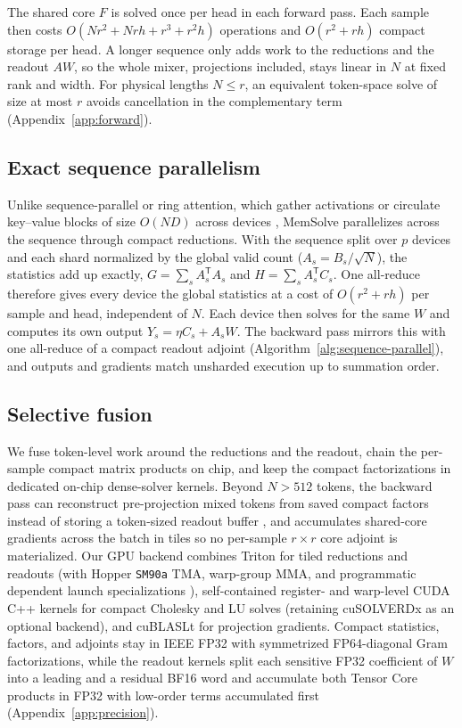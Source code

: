 \documentclass[10pt,twocolumn]{article}
\newcommand{\T}{\mathsf{T}}
\begin{document}
The shared core $F$ is solved once per head in each forward pass.
Each sample then costs $O(Nr^2+Nrh+r^3+r^2h)$ operations and $O(r^2+rh)$
compact storage per head.
A longer sequence only adds work to the reductions and the readout $AW$, so
the whole mixer, projections included, stays linear in $N$ at fixed rank and
width.
For physical lengths $N\le r$, an equivalent token-space solve of size at most
$r$ avoids cancellation in the complementary term (Appendix~\ref{app:forward}).

\subsection{Exact sequence parallelism}

Unlike sequence-parallel or ring attention, which gather activations or
circulate key--value blocks of size $O(ND)$ across devices
\cite{korthikanti2023reducing,liu2024ring}, MemSolve parallelizes across the
sequence through compact reductions.
With the sequence split over $p$ devices and each shard normalized by the
global valid count ($A_s=B_s/\sqrt N$), the statistics add up exactly,
$G=\sum_sA_s^\T A_s$ and $H=\sum_sA_s^\T C_s$.
One all-reduce therefore gives every device the global statistics at a cost of
$O(r^2+rh)$ per sample and head, independent of $N$.
Each device then solves for the same $W$ and computes its own output
$Y_s=\eta C_s+A_sW$.
The backward pass mirrors this with one all-reduce of a compact readout adjoint
(Algorithm~\ref{alg:sequence-parallel}), and outputs and gradients match
unsharded execution up to summation order.

\subsection{Selective fusion}

We fuse token-level work around the reductions and the readout, chain the
per-sample compact matrix products on chip, and keep the compact factorizations
in dedicated on-chip dense-solver kernels.
Beyond $N>512$ tokens, the backward pass can reconstruct pre-projection
mixed tokens from saved compact factors instead of storing a token-sized
readout buffer \cite{dao2022flashattention,korthikanti2023reducing}, and
accumulates shared-core gradients across the batch in tiles so no per-sample
$r\times r$ core adjoint is materialized.
Our GPU backend combines Triton \cite{tillet2019triton} for tiled reductions
and readouts (with Hopper \texttt{SM90a} TMA, warp-group MMA, and programmatic
dependent launch specializations \cite{shah2024flashattention3}),
self-contained register- and warp-level CUDA C++ kernels for compact Cholesky
and LU solves (retaining cuSOLVERDx as an optional backend), and cuBLASLt for
projection gradients.
Compact statistics, factors, and adjoints stay in IEEE FP32 with symmetrized
FP64-diagonal Gram factorizations, while the readout kernels split each
sensitive FP32 coefficient of $W$ into a leading and a residual BF16 word
\cite{henry2019bfloat} and accumulate both Tensor Core products in FP32 with
low-order terms accumulated first (Appendix~\ref{app:precision}).
\end{document}
